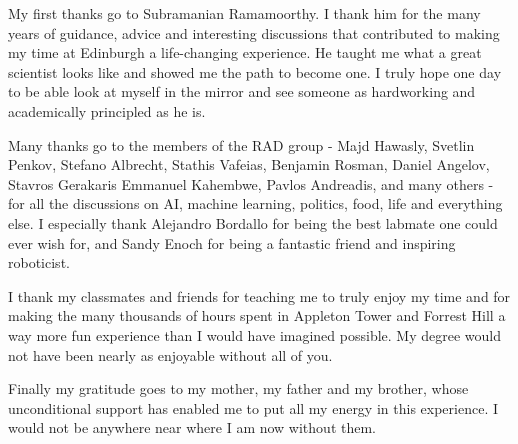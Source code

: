 \begin{acknowledgements}

  My first thanks go to Subramanian Ramamoorthy. I thank him for the many years
  of guidance, advice and interesting discussions that contributed to making my
  time at Edinburgh a life-changing experience. He taught me what a great
  scientist looks like and showed me the path to become one. I truly hope one
  day to be able look at myself in the mirror and see someone as hardworking and
  academically principled as he is.

  Many thanks go to the members of the RAD group - Majd Hawasly, Svetlin Penkov,
  Stefano Albrecht, Stathis Vafeias, Benjamin Rosman, Daniel Angelov, Stavros
  Gerakaris Emmanuel Kahembwe, Pavlos Andreadis, and many others - for all the
  discussions on AI, machine learning, politics, food, life and everything else.
  I especially thank Alejandro Bordallo for being the best labmate one could
  ever wish for, and Sandy Enoch for being a fantastic friend and inspiring
  roboticist.

  I thank my classmates and friends for teaching me to truly enjoy my time and
  for making the many thousands of hours spent in Appleton Tower and Forrest
  Hill a way more fun experience than I would have imagined possible. My degree
  would not have been nearly as enjoyable without all of you.

  Finally my gratitude goes to my mother, my father and my brother, whose
  unconditional support has enabled me to put all my energy in this experience.
  I would not be anywhere near where I am now without them.

\end{acknowledgements}